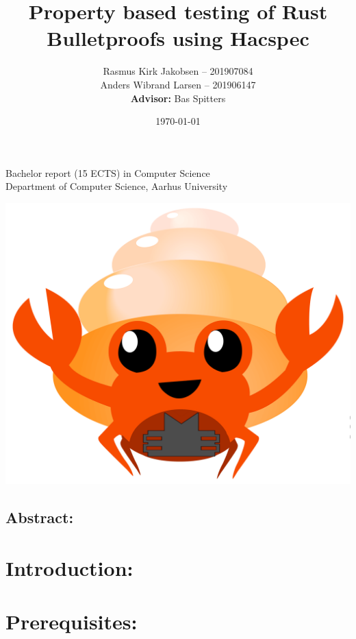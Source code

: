 \documentclass{article}
\title{Property based testing of Rust Bulletproofs using Hacspec}
\author{ 
Rasmus Kirk Jakobsen -- 201907084\\
Anders Wibrand Larsen -- 201906147\\
\textbf{Advisor:} Bas Spitters
}
\date{\today}
\begin{document}
\maketitle

\begin{center}
    Bachelor report (15 ECTS) in Computer Science\\
Department of Computer Science, Aarhus University\\
\end{center} 

\begin{center}
	\includegraphics[scale=0.4]{img/bulletproof-hacspec-2.png}
\end{center} 

\subsection*{Abstract:}

\tableofcontents

\newpage


\section{Introduction:} \label{Introduction}

\section{Prerequisites:}
\end{document}
